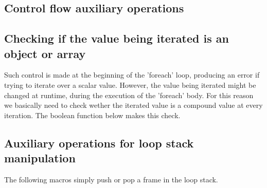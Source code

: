 \documentclass{article}
\begin{document}
\begin{kdefinition}
\begin{module}{}
\begin{kblock}[text]
 \section{Control flow auxiliary operations} \end{kblock}
\begin{kblock}[text]
 \subsection{Checking if the value being iterated is an object or array} 
		Such control is made at the beginning of the 'foreach' loop, producing an error 
		if trying to iterate over a scalar value. 
		However, the value being iterated might be changed at runtime, during the execution
		of the 'foreach' body. 
		For this reason we basically need to check wether the iterated value is a compound 
		value at every iteration. The boolean function below makes this check. \end{kblock}

\begin{syntaxBlock}{}
\end{syntaxBlock}
\begin{kblock}[text]
 \subsection{Auxiliary operations for loop stack manipulation} 
		The following macros simply push or pop a frame in the loop stack. \end{kblock}


\end{module}
\end{kdefinition}
\end{document}
